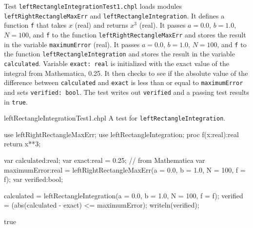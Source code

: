   \begin{enumspec}
  \item{}
    Test \lstinline{leftRectangleIntegrationTest1.chpl} loads modules
    \lstinline{leftRightRectangleMaxErr} and
    \lstinline{leftRectangleIntegration}.
    It defines a function \lstinline{f} that takes $x$ (real) and returns $x^3$ (real).
    It passes $a=0.0$, $b=1.0$, $N=100$, and \lstinline{f} to the function
    \lstinline{leftRightRectangleMaxErr} and stores the result in the variable
    \lstinline{maximumError} (real).
    It passes $a=0.0$, $b=1.0$, $N=100$, and \lstinline{f} to the function
    \lstinline{leftRectangleIntegration} and stores the result in the variable
    \lstinline{calculated}.
    Variable \lstinline{exact: real} is initialized with the exact value of the integral from
    Mathematica, 0.25.
    It then checks to see if the absolute value of the difference between \lstinline{calculated} 
    and \lstinline{exact} is less than or equal to \lstinline{maximumError} and sets 
    \lstinline{verified: bool}. The test writes out \lstinline{verified} and a passing
    test results in \lstinline{true}.
  \end{enumspec}

  \begin{chapelexample}{leftRectangleIntegrationTest1.chpl}
    A test for \lstinline{leftRectangleIntegration}.
    \begin{chapelpre}
    \end{chapelpre}
    \begin{chapel}
      use leftRightRectangleMaxErr;
      use leftRectangleIntegration;
      proc f(x:real):real {
        return x**3;
      } 

      var calculated:real;
      var exact:real = 0.25;  // from Mathematica
      var maximumError:real = leftRightRectangleMaxErr(a = 0.0, b = 1.0, N = 100, f = f);
      var verified:bool;

      calculated = leftRectangleIntegration(a = 0.0, b = 1.0, N = 100, f = f);
      verified = (abs(calculated - exact) <= maximumError);
      writeln(verified);
    \end{chapel}
    \begin{chapelpost}
    \end{chapelpost}
    \begin{chapeloutput}
true
    \end{chapeloutput}
  \end{chapelexample}

